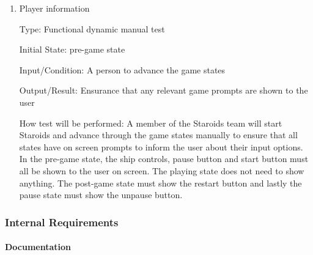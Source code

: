\documentclass[12pt, titlepage]{article}
\begin{document}
\begin{enumerate}

\item{Player information\\}

Type: Functional dynamic manual test

Initial State: pre-game state

Input/Condition: A person to advance the game states

Output/Result: Ensurance that any relevant game prompts are shown to the user

How test will be performed: A member of the Staroids team will start Staroids and advance through the game states manually to ensure that all states have on screen prompts to inform the user about their input options. In the pre-game state, the ship controls, pause button and start button must all be shown to the user on screen. The playing state does not need to show anything. The post-game state must show the restart button and lastly the pause state must show the unpause button.

\end{enumerate}

\subsubsection{Internal Requirements}

\paragraph{Documentation}
\end{document}
